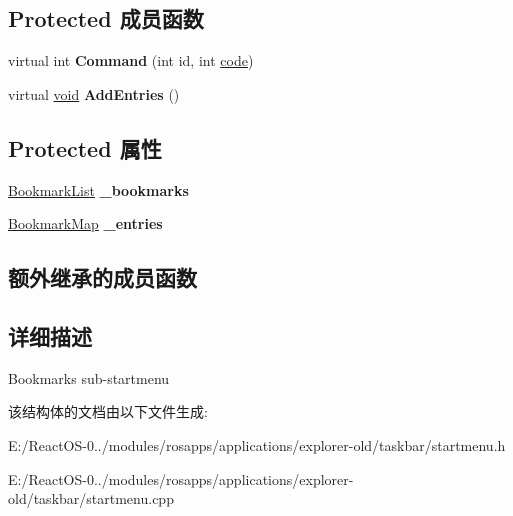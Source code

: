 \subsection*{Protected 成员函数}
\begin{DoxyCompactItemize}
\item 
\mbox{\label{struct_favorites_menu_a18b0a53b477fd1579bd5513d67693eef}} 
virtual int {\bfseries Command} (int id, int \hyperlink{structcode}{code})
\item 
\mbox{\label{struct_favorites_menu_a6367771dbd0819794a7d581864c0ceeb}} 
virtual \hyperlink{interfacevoid}{void} {\bfseries Add\+Entries} ()
\end{DoxyCompactItemize}
\subsection*{Protected 属性}
\begin{DoxyCompactItemize}
\item 
\mbox{\label{struct_favorites_menu_a575ab5c08d53ab3294a0967f11d387ca}} 
\hyperlink{struct_bookmark_list}{Bookmark\+List} {\bfseries \+\_\+bookmarks}
\item 
\mbox{\label{struct_favorites_menu_a874312eceb03ad2c347e0ece9d9f3f9d}} 
\hyperlink{classmap}{Bookmark\+Map} {\bfseries \+\_\+entries}
\end{DoxyCompactItemize}
\subsection*{额外继承的成员函数}


\subsection{详细描述}
Bookmarks sub-\/startmenu 

该结构体的文档由以下文件生成\+:\begin{DoxyCompactItemize}
\item 
E\+:/\+React\+O\+S-\/0../modules/rosapps/applications/explorer-\/old/taskbar/startmenu.\+h\item 
E\+:/\+React\+O\+S-\/0../modules/rosapps/applications/explorer-\/old/taskbar/startmenu.\+cpp\end{DoxyCompactItemize}

